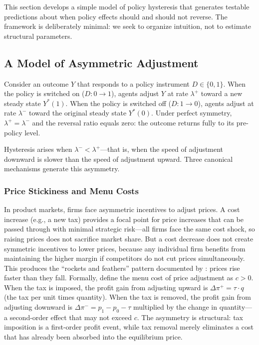 \documentclass[12pt]{article}
\begin{document}
This section develops a simple model of policy hysteresis that generates testable predictions about when policy effects should and should not reverse. The framework is deliberately minimal: we seek to organize intuition, not to estimate structural parameters.

\subsection{A Model of Asymmetric Adjustment}

Consider an outcome $Y$ that responds to a policy instrument $D \in \{0, 1\}$. When the policy is switched on ($D: 0 \to 1$), agents adjust $Y$ at rate $\lambda^{+}$ toward a new steady state $Y^*(1)$. When the policy is switched off ($D: 1 \to 0$), agents adjust at rate $\lambda^{-}$ toward the original steady state $Y^*(0)$. Under perfect symmetry, $\lambda^{+} = \lambda^{-}$ and the reversal ratio equals zero: the outcome returns fully to its pre-policy level.

Hysteresis arises when $\lambda^{-} < \lambda^{+}$---that is, when the speed of adjustment downward is slower than the speed of adjustment upward. Three canonical mechanisms generate this asymmetry.

\subsubsection{Price Stickiness and Menu Costs}

In product markets, firms face asymmetric incentives to adjust prices. A cost increase (e.g., a new tax) provides a focal point for price increases that can be passed through with minimal strategic risk---all firms face the same cost shock, so raising prices does not sacrifice market share. But a cost decrease does not create symmetric incentives to lower prices, because any individual firm benefits from maintaining the higher margin if competitors do not cut prices simultaneously. This produces the ``rockets and feathers'' pattern documented by \citet{peltzman2000prices}: prices rise faster than they fall. Formally, define the menu cost of price adjustment as $c > 0$. When the tax is imposed, the profit gain from adjusting upward is $\Delta \pi^{+} = \tau \cdot q$ (the tax per unit times quantity). When the tax is removed, the profit gain from adjusting downward is $\Delta \pi^{-} = p_{1} - p_{0} - \tau$ multiplied by the change in quantity---a second-order effect that may not exceed $c$. The asymmetry is structural: tax imposition is a first-order profit event, while tax removal merely eliminates a cost that has already been absorbed into the equilibrium price.
\end{document}
